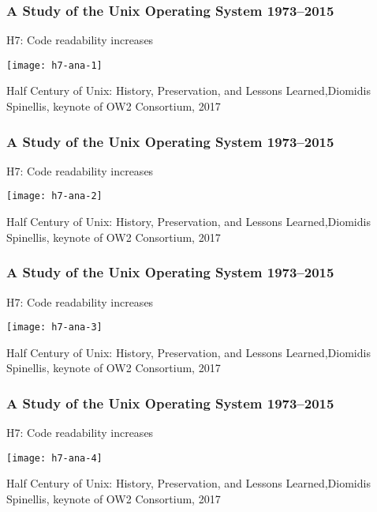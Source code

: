 \begin{frame}[plain]
	\frametitle{A Study of the Unix Operating System 1973–2015}
	\centering
	H7: Code readability increases
	
	\texttt{[image: h7-ana-1]}
	
	\tiny Half Century of Unix:
	History, Preservation, and
	Lessons Learned,Diomidis Spinellis, keynote of OW2 Consortium, 2017
	
\end{frame}

\begin{frame}[plain]
	\frametitle{A Study of the Unix Operating System 1973–2015}
	\centering
	H7: Code readability increases
	
	\texttt{[image: h7-ana-2]}
	
	\tiny Half Century of Unix:
	History, Preservation, and
	Lessons Learned,Diomidis Spinellis, keynote of OW2 Consortium, 2017
	
\end{frame}

\begin{frame}[plain]
	\frametitle{A Study of the Unix Operating System 1973–2015}
	\centering
	H7: Code readability increases
	
	\texttt{[image: h7-ana-3]}
	
	\tiny Half Century of Unix:
	History, Preservation, and
	Lessons Learned,Diomidis Spinellis, keynote of OW2 Consortium, 2017
	
\end{frame}


\begin{frame}[plain]
	\frametitle{A Study of the Unix Operating System 1973–2015}
	\centering
	H7: Code readability increases
	
	\texttt{[image: h7-ana-4]}
	
	\tiny Half Century of Unix:
	History, Preservation, and
	Lessons Learned,Diomidis Spinellis, keynote of OW2 Consortium, 2017
	
\end{frame}


